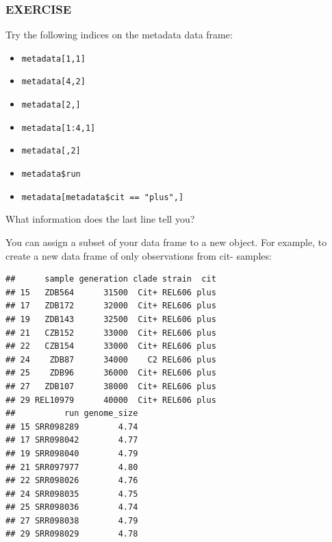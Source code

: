 \documentclass[]{book}
\newenvironment{Shaded}{\begin{snugshade}}{\end{snugshade}}
\newcommand{\NormalTok}[1]{#1}
\newcommand{\OperatorTok}[1]{\textcolor[rgb]{0.81,0.36,0.00}{\textbf{#1}}}
\newcommand{\StringTok}[1]{\textcolor[rgb]{0.31,0.60,0.02}{#1}}
\providecommand{\tightlist}{%
  \setlength{\itemsep}{0pt}\setlength{\parskip}{0pt}}
\begin{document}
\hypertarget{exercise-11}{%
\subsubsection*{EXERCISE}\label{exercise-11}}

Try the following indices on the metadata data frame:

\begin{itemize}
\tightlist
\item
  \texttt{metadata{[}1,1{]}}
\item
  \texttt{metadata{[}4,2{]}}
\item
  \texttt{metadata{[}2,{]}}
\item
  \texttt{metadata{[}1:4,1{]}}
\item
  \texttt{metadata{[},2{]}}
\item
  \texttt{metadata\$run}
\item
  \texttt{metadata{[}metadata\$cit\ ==\ "plus",{]}}
\end{itemize}

What information does the last line tell you?

You can assign a subset of your data frame to a new object. For example, to create a new data frame of only observations from cit- samples:

\begin{Shaded}
\end{Shaded}

\begin{verbatim}
##      sample generation clade strain  cit
## 15   ZDB564      31500  Cit+ REL606 plus
## 17   ZDB172      32000  Cit+ REL606 plus
## 19   ZDB143      32500  Cit+ REL606 plus
## 21   CZB152      33000  Cit+ REL606 plus
## 22   CZB154      33000  Cit+ REL606 plus
## 24    ZDB87      34000    C2 REL606 plus
## 25    ZDB96      36000  Cit+ REL606 plus
## 27   ZDB107      38000  Cit+ REL606 plus
## 29 REL10979      40000  Cit+ REL606 plus
##          run genome_size
## 15 SRR098289        4.74
## 17 SRR098042        4.77
## 19 SRR098040        4.79
## 21 SRR097977        4.80
## 22 SRR098026        4.76
## 24 SRR098035        4.75
## 25 SRR098036        4.74
## 27 SRR098038        4.79
## 29 SRR098029        4.78
\end{verbatim}
\end{document}
